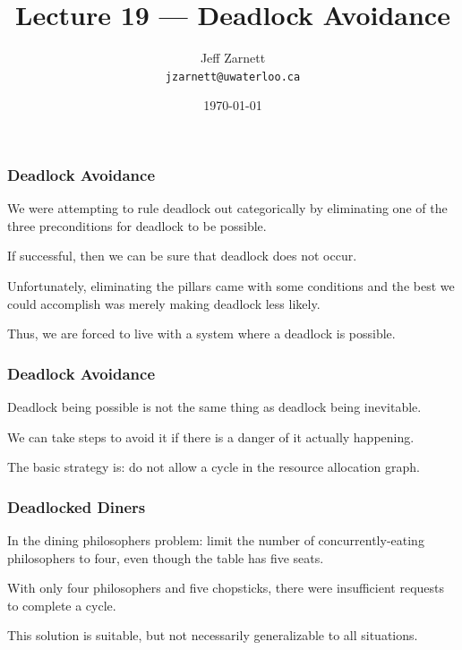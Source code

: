 

\title{Lecture 19 --- Deadlock Avoidance }

\author{Jeff Zarnett \\ \small \texttt{jzarnett@uwaterloo.ca}}
\date{\today}




\begin{frame}
  \titlepage

 \end{frame}

\begin{frame}
\frametitle{Deadlock Avoidance}

We were attempting to rule deadlock out categorically by eliminating one of the three preconditions for deadlock to be possible. 

If successful, then we can be sure that deadlock does not occur. 

Unfortunately, eliminating the pillars came with some conditions and the best we could accomplish was merely making deadlock less likely. 

Thus, we are forced to live with a system where a deadlock is possible. 
\end{frame}


\begin{frame}
\frametitle{Deadlock Avoidance}

Deadlock being possible is not the same thing as deadlock being inevitable.

We can take steps to avoid it if there is a danger of it actually happening. 

The basic strategy is: do not allow a cycle in the resource allocation graph.


\end{frame}

\begin{frame}
\frametitle{Deadlocked Diners}

In the dining philosophers problem: limit the number of concurrently-eating philosophers to four, even though the table has five seats. 

With only four philosophers and five chopsticks, there were insufficient requests to complete a cycle. 

This solution is suitable, but not necessarily generalizable to all situations.

\end{frame}

